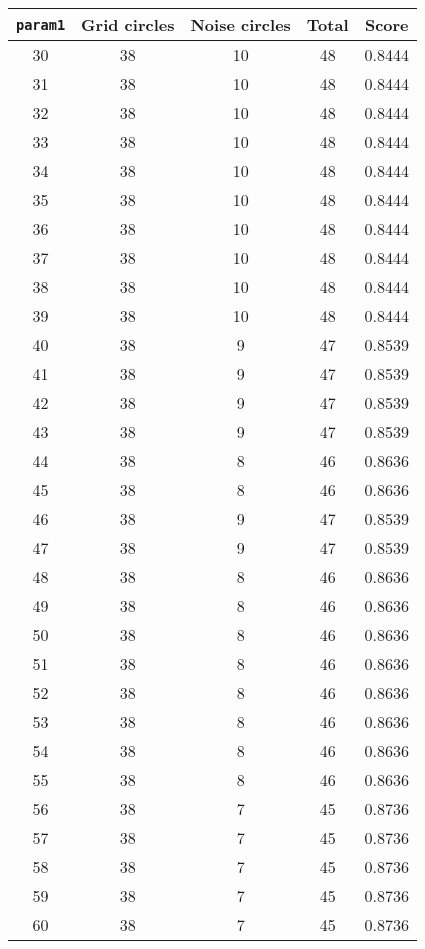 \documentclass[letterpaper, 12pt]{article}
\begin{document}
\begin{longtable}{|c|c|c|c|c|}
\hline
\textbf{\texttt{param1}} & \textbf{Grid circles} & \textbf{Noise circles} & \textbf{Total} & \textbf{Score} \\
\hline
30 & 38 & 10 & 48 & 0.8444 \\
\hline
31 & 38 & 10 & 48 & 0.8444 \\
\hline
32 & 38 & 10 & 48 & 0.8444 \\
\hline
33 & 38 & 10 & 48 & 0.8444 \\
\hline
34 & 38 & 10 & 48 & 0.8444 \\
\hline
35 & 38 & 10 & 48 & 0.8444 \\
\hline
36 & 38 & 10 & 48 & 0.8444 \\
\hline
37 & 38 & 10 & 48 & 0.8444 \\
\hline
38 & 38 & 10 & 48 & 0.8444 \\
\hline
39 & 38 & 10 & 48 & 0.8444 \\
\hline
40 & 38 & 9 & 47 & 0.8539 \\
\hline
41 & 38 & 9 & 47 & 0.8539 \\
\hline
42 & 38 & 9 & 47 & 0.8539 \\
\hline
43 & 38 & 9 & 47 & 0.8539 \\
\hline
44 & 38 & 8 & 46 & 0.8636 \\
\hline
45 & 38 & 8 & 46 & 0.8636 \\
\hline
46 & 38 & 9 & 47 & 0.8539 \\
\hline
47 & 38 & 9 & 47 & 0.8539 \\
\hline
48 & 38 & 8 & 46 & 0.8636 \\
\hline
49 & 38 & 8 & 46 & 0.8636 \\
\hline
50 & 38 & 8 & 46 & 0.8636 \\
\hline
51 & 38 & 8 & 46 & 0.8636 \\
\hline
52 & 38 & 8 & 46 & 0.8636 \\
\hline
53 & 38 & 8 & 46 & 0.8636 \\
\hline
54 & 38 & 8 & 46 & 0.8636 \\
\hline
55 & 38 & 8 & 46 & 0.8636 \\
\hline
56 & 38 & 7 & 45 & 0.8736 \\
\hline
57 & 38 & 7 & 45 & 0.8736 \\
\hline
58 & 38 & 7 & 45 & 0.8736 \\
\hline
59 & 38 & 7 & 45 & 0.8736 \\
\hline
60 & 38 & 7 & 45 & 0.8736 \\
\hline

\end{longtable}
\end{document}
